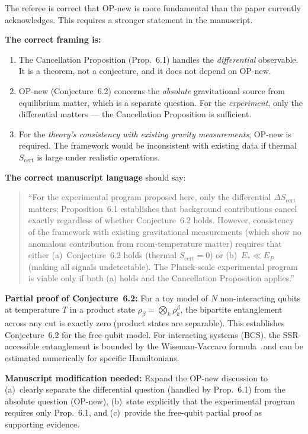 \documentclass[11pt,letterpaper]{article}
\newcommand{\Scert}{S_{\mathrm{cert}}}
\begin{document}
\begin{tcolorbox}[breakable,enhanced,colback=green!3,colframe=green!55!black,
  fonttitle=\bfseries,title={Response},boxrule=0.8pt]
The referee is correct that OP-new is more fundamental than the paper currently
acknowledges.  This requires a stronger statement in the manuscript.

\textbf{The correct framing is:}
\begin{enumerate}[noitemsep]
\item The Cancellation Proposition (Prop.~6.1) handles the \emph{differential} observable.
  It is a theorem, not a conjecture, and it does not depend on OP-new.
\item OP-new (Conjecture~6.2) concerns the \emph{absolute} gravitational source from
  equilibrium matter, which is a separate question.  For the \emph{experiment}, only
  the differential matters --- the Cancellation Proposition is sufficient.
\item For the \emph{theory's consistency with existing gravity measurements}, OP-new
  is required.  The framework would be inconsistent with existing data if thermal
  $\Scert$ is large under realistic operations.
\end{enumerate}

\textbf{The correct manuscript language} should say:
\begin{quote}
``For the experimental program proposed here, only the differential $\Delta\Scert$ matters;
Proposition~6.1 establishes that background contributions cancel exactly regardless of
whether Conjecture~6.2 holds.  However, consistency of the framework with existing
gravitational measurements (which show no anomalous contribution from room-temperature
matter) requires that either (a)~Conjecture~6.2 holds (thermal $\Scert = 0$) or
(b)~$E_* \ll E_P$ (making all signals undetectable).  The Planck-scale experimental
program is viable only if both (a) holds and the Cancellation Proposition applies.''
\end{quote}

\textbf{Partial proof of Conjecture~6.2:} For a toy model of $N$ non-interacting qubits
at temperature $T$ in a product state $\rho_\beta = \bigotimes_k \rho_k^\beta$, the
bipartite entanglement across any cut is exactly zero (product states are separable).
This establishes Conjecture~6.2 for the free-qubit model.  For interacting systems
(BCS), the SSR-accessible entanglement is bounded by the Wiseman-Vaccaro
formula~\cite{Wiseman2003} and can be estimated numerically for specific Hamiltonians.

\textbf{Manuscript modification needed:} Expand the OP-new discussion to (a)~clearly
separate the differential question (handled by Prop.~6.1) from the absolute question
(OP-new), (b)~state explicitly that the experimental program requires only Prop.~6.1,
and (c)~provide the free-qubit partial proof as supporting evidence.
\end{tcolorbox}
\end{document}

